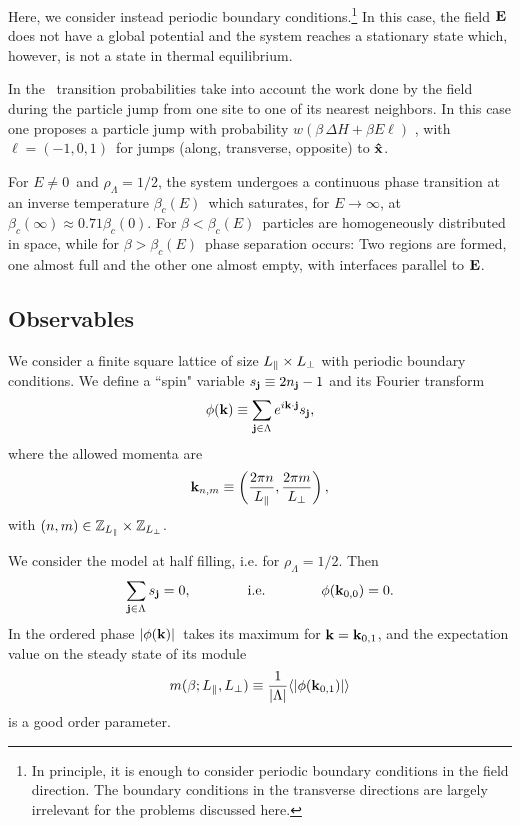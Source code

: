 \documentclass[12pt]{article}
\begin{document}
Here, we consider instead periodic boundary conditions.\footnote{
In principle, it is enough to consider periodic boundary conditions in the
field direction. The boundary conditions in the transverse directions
are largely irrelevant for the problems discussed here. }
In this case, the field ${\bf E}$ does not have a global potential and  
the system reaches a stationary state which, however, is not a state 
in thermal equilibrium.

In the \dlg\  transition
probabilities take into account the work done by the field during the
particle jump from one site to one of its nearest neighbors. In this case
one proposes a particle jump with probability 
       $w(\beta\,\Delta H+\beta E \ell )$     ,
with $\ell = (-1, 0, 1)$\ for jumps (along, transverse, opposite) to 
${\bf \hat{x}}$.

For $E \neq 0$\ and $\rho_{\Lambda}=1/2$, the system 
undergoes a continuous phase
transition \cite{Schmittmann95,MarroDickman} at an
inverse temperature $\beta_{c}(E)$\ which saturates, for
$E\rightarrow\infty$, at $\beta_{c}(\infty) \approx 0.71
\beta_{c}(0)$. For $\beta<\beta_{c}(E)$\ particles are  homogeneously
distributed in space, while for $\beta>\beta_{c}(E)$\,  phase separation
occurs:
Two regions are formed, one almost full and the other one almost empty,
with interfaces parallel to ${\bf E}$.
  

\subsection{Observables}
\label{sec:observables}

We consider a finite square lattice of size $L_{\|}\times
L_{\bot}$ with periodic boundary conditions. We define 
a ``spin" variable $s_{{\bf j}} \equiv  2 n_{{\bf j}} - 1$ 
and its Fourier transform 
\begin{equation}
        \phi({\bf k}) \equiv \sum_{{\bf j}\in\Lambda} 
         e^{i {\bf k}\cdot{\bf j}} s_{{\bf j}},
\end{equation}
where the allowed momenta are
\begin{equation}
        {\bf k}_{n,m} \equiv
      \left (\frac{2\pi n}{L_{\|}},\frac{2\pi m}{L_{\bot}} \right ),
\end{equation}
with $(n,m)\in\mathbb{Z}_\protect{L_{\|}}\times\mathbb{Z}_\protect{L_{\bot}} $. 

We consider the model at half filling, i.e. for $\rho_\Lambda = 1/2$. Then
\begin{equation}
        \sum_{{\bf j}\in\Lambda} s_{{\bf j}} = 0, \qquad\qquad 
        {\rm i.e.} \qquad\qquad
        \phi({\bf k}_{0,0})=0. \label{zero}
\end{equation}
In the ordered phase $|\phi({\bf k})|$\ takes its maximum for \mbox{${\bf k} =
{\bf k}_{0,1}$}, and the expectation value on the steady state of its module
\begin{equation}
        m(\beta;L_{\|},L_{\bot}) \equiv {1\over |\Lambda|}
            \langle|\phi({\bf k}_{0,1})| \rangle
\label{magnetization}
\end{equation}
is a good order parameter.
\end{document}

